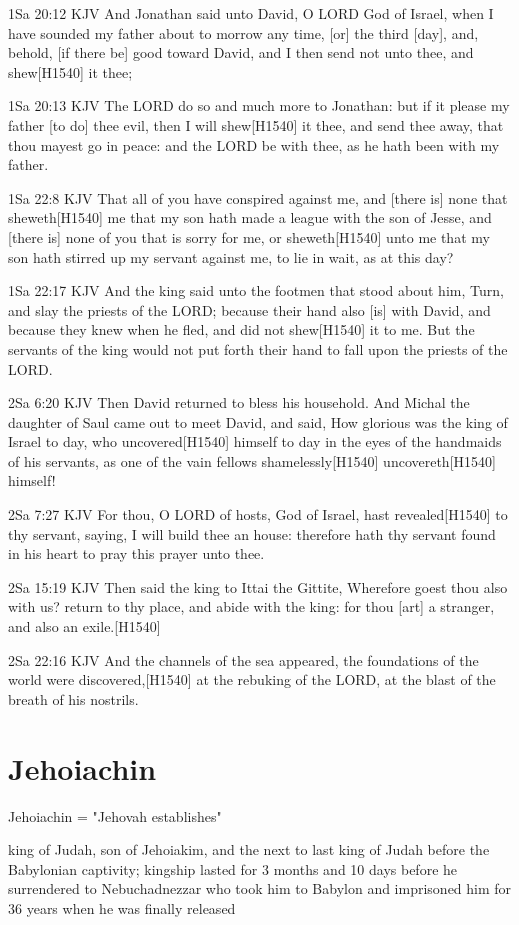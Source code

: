 \documentclass{book}
\begin{document}
1Sa 20:12 KJV
And Jonathan said unto David, O LORD God of Israel, when I have sounded my father about to morrow any time, [or] the third [day], and, behold, [if there be] good toward David, and I then send not unto thee, and shew[H1540] it thee;

1Sa 20:13 KJV
The LORD do so and much more to Jonathan: but if it please my father [to do] thee evil, then I will shew[H1540] it thee, and send thee away, that thou mayest go in peace: and the LORD be with thee, as he hath been with my father.

1Sa 22:8 KJV
That all of you have conspired against me, and [there is] none that sheweth[H1540] me that my son hath made a league with the son of Jesse, and [there is] none of you that is sorry for me, or sheweth[H1540] unto me that my son hath stirred up my servant against me, to lie in wait, as at this day?

1Sa 22:17 KJV
And the king said unto the footmen that stood about him, Turn, and slay the priests of the LORD; because their hand also [is] with David, and because they knew when he fled, and did not shew[H1540] it to me. But the servants of the king would not put forth their hand to fall upon the priests of the LORD.

2Sa 6:20 KJV
Then David returned to bless his household. And Michal the daughter of Saul came out to meet David, and said, How glorious was the king of Israel to day, who uncovered[H1540] himself to day in the eyes of the handmaids of his servants, as one of the vain fellows shamelessly[H1540] uncovereth[H1540] himself!

2Sa 7:27 KJV
For thou, O LORD of hosts, God of Israel, hast revealed[H1540] to thy servant, saying, I will build thee an house: therefore hath thy servant found in his heart to pray this prayer unto thee.

2Sa 15:19 KJV
Then said the king to Ittai the Gittite, Wherefore goest thou also with us? return to thy place, and abide with the king: for thou [art] a stranger, and also an exile.[H1540]

2Sa 22:16 KJV
And the channels of the sea appeared, the foundations of the world were discovered,[H1540] at the rebuking of the LORD, at the blast of the breath of his nostrils.

\chapter{Jehoiachin}

Jehoiachin = "Jehovah establishes"

king of Judah, son of Jehoiakim, and the next to last king of Judah before the Babylonian captivity; kingship lasted for 3 months and 10 days before he surrendered to Nebuchadnezzar who took him to Babylon and imprisoned him for 36 years when he was finally released


\section{}
\end{document}
